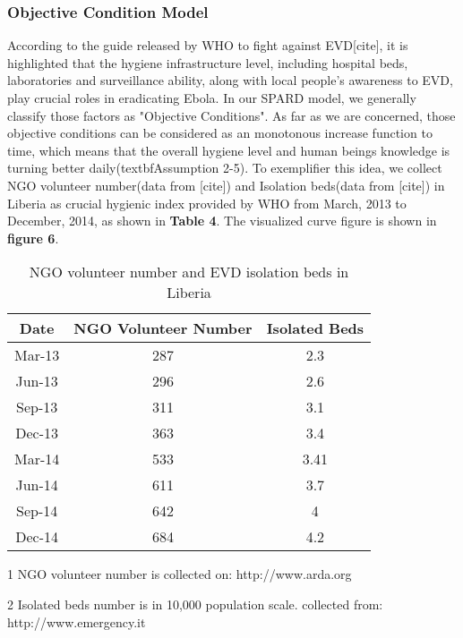 \subsubsection{Objective Condition Model}
According to the guide released by WHO to fight against EVD[cite], it is highlighted that the hygiene infrastructure level, including hospital beds, laboratories and surveillance ability, along with local people's awareness to EVD, play crucial roles in eradicating Ebola. In our SPARD model, we generally classify those factors as "Objective Conditions". As far as we are concerned, those objective conditions can be considered as an monotonous increase function to time, which means that the overall hygiene level and human beings knowledge is turning better daily(textbf{Assumption 2-5}). To exemplifier this idea, we collect NGO volunteer number(data from [cite]) and Isolation beds(data from [cite]) in Liberia as crucial hygienic index provided by WHO from March, 2013 to December, 2014, as shown in \textbf{Table 4}. The visualized curve figure is shown in \textbf{figure 6}.
\begin{table}[htbp]
\centering
\caption{NGO volunteer number and EVD isolation beds in Liberia} 
\begin{tabular}{|c|c|c|}
\hline
{\bf Date \tnote{1}} & {\bf NGO Volunteer Number \tnote{2}} & {\bf Isolated Beds} \\
\hline
    Mar-13 &        287 &        2.3 \\
\hline
    Jun-13 &        296 &        2.6 \\
\hline
    Sep-13 &        311 &        3.1 \\
\hline
    Dec-13 &        363 &        3.4 \\
\hline
    Mar-14 &        533 &       3.41 \\
\hline
    Jun-14 &        611 &        3.7 \\
\hline
    Sep-14 &        642 &          4 \\
\hline
    Dec-14 &        684 &        4.2 \\
\hline
\end{tabular}  
\begin{tablenotes}
        \footnotesize
        \item[1] NGO volunteer number is collected on: http://www.arda.org
        \item[2] Isolated beds number is in 10,000 population scale. collected from: http://www.emergency.it 
\end{tablenotes}

\end{table}


